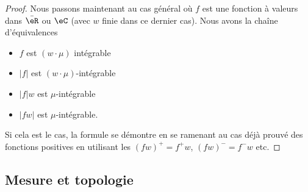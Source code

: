 \begin{proof}
    Nous passons maintenant au cas général où \( f\) est une fonction à valeurs dans \( \bar\eR\) ou \( \eC\) (avec \( w\) finie dans ce dernier cas). Nous avons la chaîne d'équivalences 
    \begin{itemize}
            \renewcommand{\labelitemi}{$\Leftrightarrow$}
        \item \( f\) est \( (w\cdot\mu)\) intégrable
        \item \( | f |\) est \( (w\cdot\mu)\)-intégrable
        \item \( | f |w\) est \( \mu\)-intégrable
        \item \( | fw |\) est \( \mu\)-intégrable.
    \end{itemize}

    Si cela est le cas, la formule se démontre en se ramenant au cas déjà prouvé des fonctions positives en utilisant les \( (fw)^+=f^+w\), \( (fw)^-=f^-w\) etc.
\end{proof}

\subsection{Mesure et topologie}

